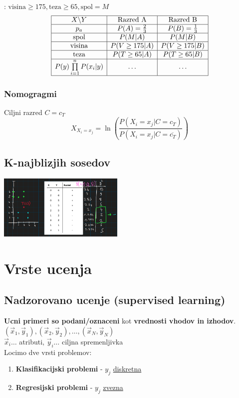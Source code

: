: $\text{visina}\geq175, \text{teza}\geq 65, \text{spol}=M$
$$
\begin{array}{|c|c|c|}
    \hline
    X\backslash Y   & \text{Razred A}      & \text{Razred B}\\
    \hline
    p_a           & P(A) = \frac{2}{3}    & P(B) = \frac{1}{3}\\
    \hline
    \text{spol}   & P(M|A) & P(M|B)\\
    \hline
    \text{visina} & P(V\geq 175|A) & P(V\geq 175 | B)\\
    \hline
    \text{teza} & P(T\geq 65|A) & P(T\geq 65| B)\\
    \hline
    P(y)\prod\limits_{i=1}^n P(x_i|y) & \dots & \dots\\
    \hline
\end{array}
$$

\subsubsection{Nomogragmi}
Ciljni razred $C=c_T$
$$X_{X_i=x_j}=\ln \left( \frac{P(X_i=x_j|C=c_T)}{P(X_i=x_j|C=\overline{c_T})} \right)$$

\subsection{K-najblizjih sosedov}
\includegraphics[width=6cm]{./images/knn.png}\\


\section{Vrste ucenja}
\subsection{Nadzorovano ucenje (supervised learning)}
\textbf{Ucni primeri so podani/oznaceni} kot \textbf{vrednosti vhodov in izhodov}.\\
$(\vec{x}_1,\vec{y}_1),(\vec{x}_2,\vec{y}_2),\dots,(\vec{x}_N,\vec{y}_N)$\\
$\vec{x}_i\dots$ atributi, $\vec{y}_i\dots$ ciljna spremenljivka\\
Locimo dve vrsti problemov:
\begin{enumerate}[leftmargin=*,noitemsep,topsep=0pt,partopsep=0pt]
    \item \textbf{Klasifikacijski problemi} - $y_j$ \underline{diskretna} 
    \item \textbf{Regresijski problemi} - $y_j$ \underline{zvezna} 
\end{enumerate}

